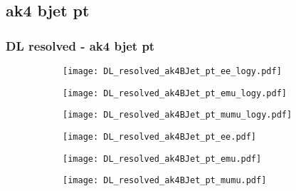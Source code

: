 \documentclass[aspectratio=169,8pt]{beamer}
\begin{document}
\subsection{ak4 bjet pt}
\begin{frame}
\frametitle{DL resolved - ak4 bjet pt}
\begin{figure}
\captionsetup[subfigure]{labelformat=empty}
\begin{subfigure}{0.32\textwidth}
\texttt{[image: DL\_resolved\_ak4BJet\_pt\_ee\_logy.pdf]}
\vspace*{-0.15cm}
\end{subfigure}
\hfil
\begin{subfigure}{0.32\textwidth}
\texttt{[image: DL\_resolved\_ak4BJet\_pt\_emu\_logy.pdf]}
\vspace*{-0.15cm}
\end{subfigure}
\hfil
\begin{subfigure}{0.32\textwidth}
\texttt{[image: DL\_resolved\_ak4BJet\_pt\_mumu\_logy.pdf]}
\vspace*{-0.15cm}
\end{subfigure}
\hfil
\begin{subfigure}{0.32\textwidth}
\texttt{[image: DL\_resolved\_ak4BJet\_pt\_ee.pdf]}
\vspace*{-0.15cm}
\end{subfigure}
\hfil
\begin{subfigure}{0.32\textwidth}
\texttt{[image: DL\_resolved\_ak4BJet\_pt\_emu.pdf]}
\vspace*{-0.15cm}
\end{subfigure}
\hfil
\begin{subfigure}{0.32\textwidth}
\texttt{[image: DL\_resolved\_ak4BJet\_pt\_mumu.pdf]}
\vspace*{-0.15cm}
\end{subfigure}
\hfil
\end{figure}
\end{frame}
\newpage
\end{document}
